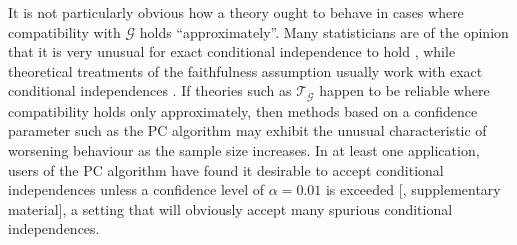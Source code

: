 \begin{example}
It is not particularly obvious how a theory ought to behave in cases where compatibility with $\mathcal{G}$ holds ``approximately''. Many statisticians are of the opinion that it is very unusual for exact conditional independence to hold \citep{gelman_bayesian_2010,meehl_theory-testing_1967,berkson_difficulties_1938}, while theoretical treatments of the faithfulness assumption usually work with exact conditional independences \citep{meek_strong_1995}. If theories such as $\mathscr{T}_{\mathcal{G}}$ happen to be reliable where compatibility holds only approximately, then methods based on a confidence parameter such as the PC algorithm may exhibit the unusual characteristic of worsening behaviour as the sample size increases. In at least one application, users of the PC algorithm have found it desirable to accept conditional independences unless a confidence level of $\alpha=0.01$ is exceeded [\cite{maathuis_predicting_2010}, supplementary material], a setting that will obviously accept many spurious conditional independences. 
\end{example}